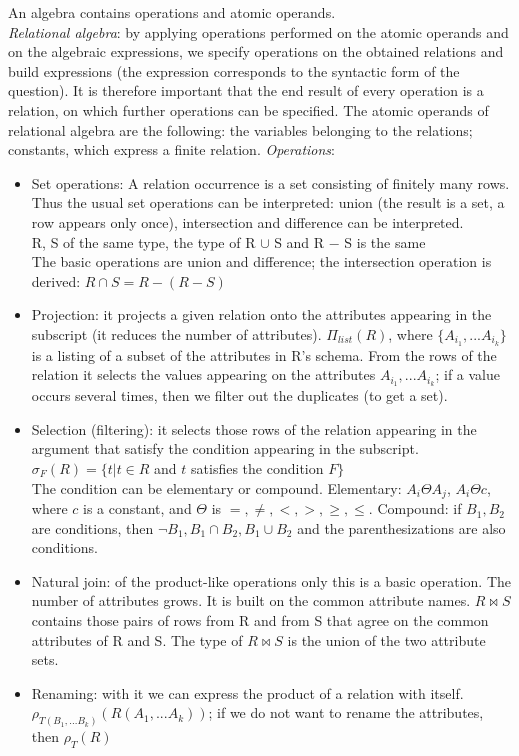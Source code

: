 \documentclass[margin=0px]{article}
\begin{document}
An algebra contains operations and atomic operands. \\
\textit{Relational algebra}: by applying operations performed on the atomic operands and on the algebraic expressions, we specify operations on the obtained relations and build expressions (the expression corresponds to the syntactic form of the question). It is therefore important that the end result of every operation is a relation, on which further operations can be specified. The atomic operands of relational algebra are the following: the variables belonging to the relations; constants, which express a finite relation.
\textit{Operations}:
\begin{itemize}
    \item Set operations: A relation occurrence is a set consisting of finitely many rows. Thus the usual set operations can be interpreted: union (the result is a set, a row appears only once), intersection and difference can be interpreted. \\
          R, S of the same type, the type of R $\cup$ S and R $-$ S is the same \\
          The basic operations are union and difference; the intersection operation is derived: $R \cap S = R - (R - S)$
    \item Projection: it projects a given relation onto the attributes appearing in the subscript (it reduces the number of attributes). $\Pi_{list}(R)$, where $\{A_{i_1},...A_{i_k}\}$ is a listing of a subset of the attributes in R's schema. From the rows of the relation it selects the values appearing on the attributes $A_{i_1},...A_{i_k}$; if a value occurs several times, then we filter out the duplicates (to get a set).
    \item Selection (filtering): it selects those rows of the relation appearing in the argument that satisfy the condition appearing in the subscript. $\sigma_F(R) = \{t|t \in R$ and $t$ satisfies the condition $F\}$ \\
          The condition can be elementary or compound. Elementary: $A_i \Theta A_j$, $A_i \Theta c$, where $c$ is a constant, and $\Theta$ is $=, \neq, <, >, \geq, \leq$. Compound: if $B_1, B_2$ are conditions, then $\neg B_1, B_1 \cap B_2, B_1 \cup B_2$ and the parenthesizations are also conditions.
    \item Natural join: of the product-like operations only this is a basic operation. The number of attributes grows. It is built on the common attribute names. $R \bowtie S$ contains those pairs of rows from R and from S that agree on the common attributes of R and S. The type of $R \bowtie S$ is the union of the two attribute sets.
    \item Renaming: with it we can express the product of a relation with itself. $\rho_{T(B_1,...B_k)}(R(A_1,...A_k))$; if we do not want to rename the attributes, then $\rho_{T}(R)$
\end{itemize}
\end{document}
